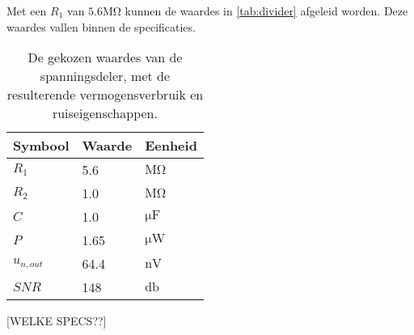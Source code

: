 Met een $R_1$ van $5.6\si{\mega\ohm}$ kunnen de waardes in \autoref{tab:divider} afgeleid worden. Deze waardes vallen binnen de specificaties.

\begin{table}[ht]
\centering
\begin{tabular}{lll}
    Symbool & Waarde & Eenheid \\
    \hline
    $R_1$       & 5.6  & $\si{\mega\ohm}$   \\
    $R_2$       & 1.0  & $\si{\mega\ohm}$   \\
    $C$         & 1.0  & $\si{\micro\farad}$\\
    $P$         & 1.65 & $\si{\micro\watt}$ \\
    $u_{n,out}$ & 64.4 & $\si{\nano\volt}$  \\
    $SNR$       & 148  & $\si{\decibel}$
\end{tabular}
\caption{De gekozen waardes van de spanningsdeler, met de resulterende vermogensverbruik en ruiseigenschappen.}
\label{tab:divider}
\end{table}

[WELKE SPECS??]
